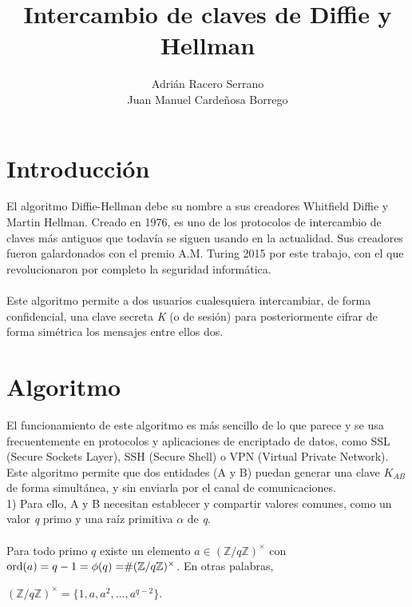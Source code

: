 \documentclass[11pt]{article}
\title{\textbf{Intercambio de claves de Diffie y Hellman}}
\author{Adrián Racero Serrano\\Juan Manuel Cardeñosa Borrego}
\date{}
\begin{document}
\maketitle
\thispagestyle{empty}

\newpage

\setcounter{page}{1}
\tableofcontents

\newpage

\section{Introducción}
El algoritmo Diffie-Hellman debe su nombre a sus creadores Whitfield Diffie y Martin Hellman. Creado en 1976, es uno de los protocolos de intercambio de claves más antiguos que todavía se siguen usando en la actualidad. Sus creadores fueron galardonados con el premio A.M. Turing 2015 por este trabajo, con el que revolucionaron por completo la seguridad informática.\\\\
Este algoritmo permite a dos usuarios cualesquiera intercambiar, de forma confidencial, una clave secreta \textit{K} (o de sesión) para posteriormente cifrar de forma simétrica los mensajes entre ellos dos.

\section{Algoritmo}
El funcionamiento de este algoritmo es más sencillo de lo que parece y se usa frecuentemente en protocolos y aplicaciones de encriptado de datos, como SSL (Secure Sockets Layer), SSH (Secure Shell) o VPN (Virtual Private Network). Este algoritmo permite que dos entidades (A y B) puedan generar una clave $K_{AB}$ de forma simultánea, y sin enviarla por el canal de comunicaciones. \\

1) Para ello, A y B necesitan establecer y compartir valores comunes, como un valor \textit{q} primo y una raíz primitiva $\alpha$  de \textit{q}. \\\\
Para todo primo \(q\) existe un elemento \(a \in (\mathbb{Z}/q\mathbb{Z})^{\times}\) con \(\text{ord}(a) = q - 1 = \phi(q) =  $\#$ (\mathbb{Z}/q\mathbb{Z})^{\times}\). En otras palabras,

\begin{center}
\((\mathbb{Z}/q\mathbb{Z})^{\times} = \{1, a, a^2, \ldots, a^{q-2}\}\).\\
\end{center}
\end{document}
